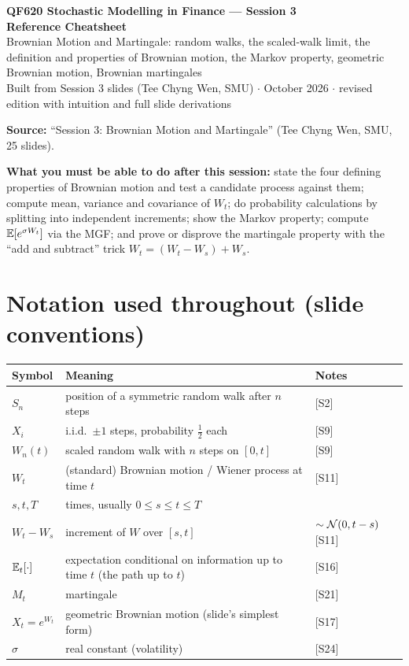 \documentclass[10pt]{article}
\begin{document}
\begin{center}
{\LARGE\bfseries QF620 Stochastic Modelling in Finance --- Session 3\\[2pt] Reference Cheatsheet}\\[6pt]
{\large Brownian Motion and Martingale: random walks, the scaled-walk limit, the definition and properties of Brownian motion, the Markov property, geometric Brownian motion, Brownian martingales}\\[4pt]
{\small Built from Session 3 slides (Tee Chyng Wen, SMU) $\cdot$ October 2026 $\cdot$ revised edition with intuition and full slide derivations}
\end{center}
\tableofcontents
\vspace{4pt}
\textbf{Source:} ``Session 3: Brownian Motion and Martingale'' (Tee Chyng Wen, SMU, 25 slides).

\legend

\textbf{What you must be able to do after this session:} state the four defining properties of Brownian motion and test a candidate process against them; compute mean, variance and covariance of $W_t$; do probability calculations by splitting into independent increments; show the Markov property; compute $\mathbb{E}[e^{\sigma W_t}]$ via the MGF; and prove or disprove the martingale property with the ``add and subtract'' trick $W_t=(W_t-W_s)+W_s$.

\section*{Notation used throughout (slide conventions)}
{\small\renewcommand{\arraystretch}{1.12}
\begin{tabularx}{\linewidth}{@{}l X l@{}}\toprule
Symbol & Meaning & Notes\\\midrule
$S_n$ & position of a symmetric random walk after $n$ steps & [S2]\\
$X_i$ & i.i.d.\ $\pm1$ steps, probability $\frac12$ each & [S9]\\
$W_n(t)$ & scaled random walk with $n$ steps on $[0,t]$ & [S9]\\
$W_t$ & (standard) Brownian motion / Wiener process at time $t$ & [S11]\\
$s,t,T$ & times, usually $0\le s\le t\le T$ & \\
$W_t-W_s$ & increment of $W$ over $[s,t]$ & $\sim\mathcal{N}(0,t-s)$ [S11]\\
$\mathbb{E}_t[\cdot]$ & expectation conditional on information up to time $t$ (the path up to $t$) & [S16]\\
$M_t$ & martingale & [S21]\\
$X_t=e^{W_t}$ & geometric Brownian motion (slide's simplest form) & [S17]\\
$\sigma$ & real constant (volatility) & [S24]\\\bottomrule
\end{tabularx}}
\end{document}
